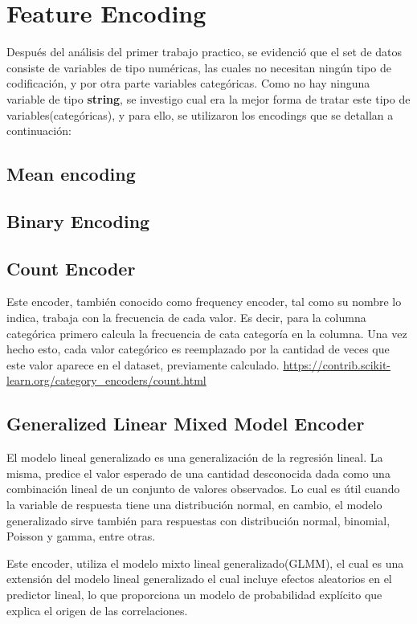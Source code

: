 \documentclass[12pt,a4paper]{article}
\begin{document}
\section{Feature Encoding}
Después del análisis del primer trabajo practico, se evidenció que el set de datos consiste de variables de tipo numéricas, las cuales no necesitan ningún tipo de codificación, y por otra parte variables categóricas. Como no hay ninguna variable de tipo \textbf{string}, se investigo cual era la mejor forma de tratar este tipo de variables(categóricas), y para ello, se utilizaron los encodings que se detallan a continuación:

\subsection{Mean encoding}
\subsection{Binary Encoding}
\subsection{Count Encoder}
Este encoder, también conocido como frequency encoder, tal como su nombre lo indica, trabaja con la frecuencia de cada valor. Es decir, para la columna categórica primero calcula la frecuencia de cata categoría en la columna. Una vez hecho esto, cada valor categórico es reemplazado por la cantidad de veces que este valor aparece en el dataset, previamente calculado.
\url{https://contrib.scikit-learn.org/category_encoders/count.html}

\subsection{Generalized Linear Mixed Model Encoder}

El modelo lineal generalizado es una generalización de la regresión lineal. La misma, predice el valor esperado de una cantidad desconocida dada como una combinación lineal de un conjunto de valores observados. Lo cual es útil cuando la variable de respuesta tiene una distribución normal, en cambio, el modelo generalizado sirve también para respuestas con distribución normal, binomial, Poisson y gamma, entre otras. \newline

Este encoder, utiliza el modelo mixto lineal generalizado(GLMM), el cual es una extensión del modelo lineal generalizado el cual incluye efectos aleatorios en el predictor lineal, lo que proporciona un modelo de probabilidad explícito que explica el origen de las correlaciones.\newline
\end{document}
